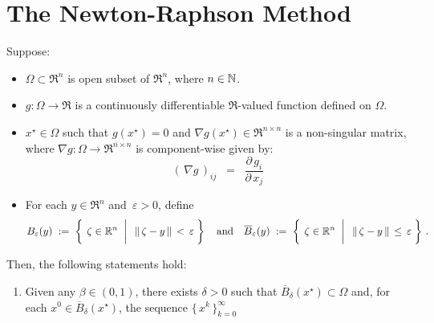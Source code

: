 

\section{The Newton-Raphson Method}
\setcounter{theorem}{0}
\setcounter{equation}{0}

\renewcommand{\theenumi}{\roman{enumi}}
\renewcommand{\labelenumi}{\textnormal{(\theenumi)}$\;\;$}


\begin{theorem}
\mbox{}\vskip 0.1cm
\noindent
Suppose:
\begin{itemize}
\item
	$\Omega \subset \Re^{n}$ is open subset of $\Re^{n}$, where $n \in \mathbb{N}$.
\item
	$g : \Omega \longrightarrow \Re$ is a continuously differentiable $\Re$-valued function
	defined on $\Omega$.
\item
	$x^{\star} \in \Omega$ such that $g(x^{\star}) = 0$ and
	$\nabla g(x^{\star}) \in \Re^{n \times n}$ is a non-singular matrix,
	where $\nabla g : \Omega \longrightarrow \Re^{n \times n}$ is component-wise given by:
	\begin{equation*}
	(\,\nabla g\,)_{ij}
	\;\; = \;\;
		\dfrac{\partial\,g_{i}}{\partial\,x_{j}}
	\end{equation*}
\item
	For each $y \in \Re^{n}$ and \,$\varepsilon > 0$, define
	\begin{equation*}
	B_{\varepsilon}(y)
	\; := \;
		\left\{\;\left.
		\zeta \overset{{\color{white}+}}{\in} \Re^{n}
		\;\;\right\vert\;\;
		\Vert\,\zeta - y\,\Vert \,<\, \varepsilon
		\;\right\}
	\quad\textnormal{and}\quad
	\overline{B}_{\varepsilon}(y)
	\; := \;
		\left\{\;\left.
		\zeta \overset{{\color{white}+}}{\in} \Re^{n}
		\;\;\right\vert\;\;
		\Vert\,\zeta - y\,\Vert \,\leq\, \varepsilon
		\;\right\}\,.
	\end{equation*}
\end{itemize}
Then, the following statements hold:
\begin{enumerate}
\item\label{NewtonRaphsonGeometricConvergence}
	Given any $\beta \in (0,1)$,
	there exists $\delta > 0$ such that $\overline{B}_{\delta}(x^{\star}) \subset \Omega$ and,
	for each $x^{0} \in \overline{B}_{\delta}(x^{\star})$, the sequence $\{\,x^{k}\,\}_{k=0}^{\infty}$

\end{enumerate}
\end{theorem}
